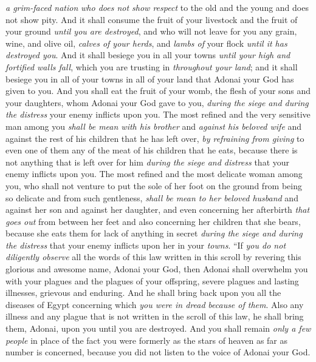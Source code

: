 \begin{biblechapter}
\verse \textit{a grim-faced nation} \textit{who does not show respect} to the old and the young and does not show pity.
\verse And it shall consume the fruit of your livestock and the fruit of your ground \textit{until you are destroyed}, and who will not leave for you any grain, wine, and olive oil, \textit{calves of your herds}, and \textit{lambs of} your flock \textit{until it has destroyed you}.
\verse And it shall besiege you in all your towns \textit{until your high and fortified walls fall}, which you are trusting in \textit{throughout your land}; and it shall besiege you in all of your towns in all of your land that Adonai your God has given to you.
\verse And you shall eat the fruit of your womb, the flesh of your sons and your daughters, whom Adonai your God gave to you, \textit{during the siege and during the distress} your enemy inflicts upon you.
\verse The most refined and the very sensitive man among you \textit{shall be mean with his brother} and \textit{against his beloved wife} and against the rest of his children that he has left over,
\verse \textit{by refraining from giving} to even one of them any of the meat of his children that he eats, because there is not anything that is left over for him \textit{during the siege and distress} that your enemy inflicts upon you.
\verse The most refined and the most delicate woman among you, who shall not venture to put the sole of her foot on the ground from being so delicate and from such gentleness, \textit{shall be mean to her beloved husband} and against her son and against her daughter,
\verse and even concerning her afterbirth \textit{that goes out} from between her feet and also concerning her children that she bears, because she eats them for lack of anything in secret \textit{during the siege and during the distress} that your enemy inflicts upon her in your \textit{towns}.
\verse “If \textit{you do not diligently observe} all the words of this law written in this scroll by revering this glorious and awesome name, Adonai your God,
\verse then Adonai shall overwhelm you with your plagues and the plagues of your offspring, severe plagues and lasting illnesses, grievous and enduring.
\verse And he shall bring back upon you all the diseases of Egypt concerning which \textit{you were in dread} \textit{because of them}.
\verse Also any illness and any plague that is not written in the scroll of this law, he shall bring them, Adonai, upon you until you are destroyed.
\verse And you shall remain \textit{only a few people} in place of the fact you were formerly as the stars of heaven as far as number is concerned, because you did not listen to the voice of Adonai your God.

\end{biblechapter}
